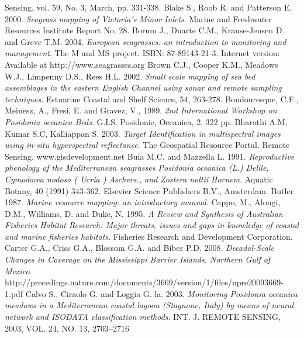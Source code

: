 \documentclass[10pt, a4paper]{article}
\begin{document}
\begin{thebibliography}{999}
Sensing, vol. 59, No. 3, March, pp. 331-338. \pageref{Bierwirth93}
Blake S., Roob R. and Patterson E. 2000. \emph{Seagrass mapping of Victoria's Minor Inlets}.
Marine and Freshwater Resources Institute Report No. 28. \pageref{Blake00}
Borum J., Duarte C.M., Krause-Jensen D. and Greve T.M. 2004. \emph{European seagrasses:
an introduction to monitoring and management}. The M and MS project. ISBN: 87-89143-21-3.
Internet version: Available at http://www.seagrasses.org \pageref{Borum04}
Brown C.J., Cooper K.M., Meadows W.J., Limpenny D.S., Rees H.L. 2002. \emph{Small scale
mapping of sea bed assemblages in the eastern English Channel using sonar and remote
sampling techniques}. Estuarine Coastal and Shelf Science, 54, 263-278. \pageref{Brown02}
Boudouresque, C.F., Meinesz, A., Fresi, E. and Gravez, V., 1989. \emph{2nd International
Workshop on \textit{Posidonia oceanica} Beds}. G.I.S. Posidonie, Oceanica, 2, 322 pp. \pageref{Boudouresque89}
Bharathi A.M, Kumar S.C, Kalliappan S. 2003. \emph{Target Identification in multispectral images
using \textit{in-situ} hyperspectral reflectance}. The Geospatial Resource Portal. Remote Sensing.
www.gisdevelopment.net \pageref{Bharathi03}
Buia M.C. and Mazzella L. 1991. \emph{Reproductive phenology of the Mediterranean
seagrasses \textit{Posidonia oceanica} (L.) Delile, Cymodocea nodosa ( Ucria ) Aschers., and
Zostera noltii Hornem}. Aquatic Botany, 40 (1991) 343-362. Elsevier Science Publishers
B.V., Amsterdam. \pageref{Buia91}
Butler 1987. \emph{Marine resource mapping: an introductory manual}. \pageref{Butler87}
Cappo, M., Alongi, D.M., Williams, D. and Duke, N. 1995. \emph{A Review and Synthesis of
Australian Fisheries Habitat Research: Major threats, issues and gaps in knowledge of
coastal and marine fisheries habitats}. Fisheries Research and Development Corporation. \pageref{Cappo95}
Carter G.A., Criss G.A., Blossom G.A. and Biber P.D. 2008. \emph{Decadal-Scale Changes in
Coverage on the Mississippi Barrier Islands, Northern Gulf of Mexico}.
http://precedings.nature.com/documents/3669/version/1/files/npre20093669-1.pdf \pageref{Carter08}
Calvo S., Ciraolo G. and Loggia G. la. 2003. \emph{Monitoring \textit{Posidonia oceanica} meadows
in a Mediterranean coastal lagoon (Stagnone, Italy) by means of neural network and
ISODATA classification methods}. INT. J. REMOTE SENSING, 2003, VOL. 24, NO. 13,
2703–2716 \pageref{Calvo03}

\end{thebibliography}
\end{document}
